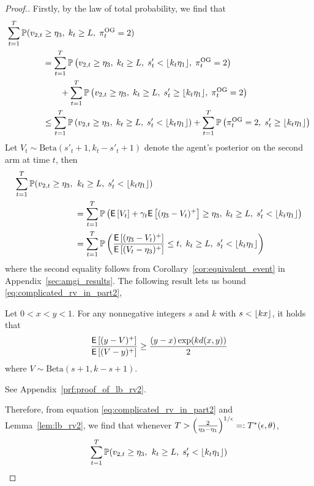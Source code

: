 \begin{proof}[Proof.]
	Firstly, by the law of total probability, we find that
	\begin{align} 
	\sum_{t=1}^T \mathbb{P}(v_{2,t} & \ge \eta_3 ,\; k_t \ge L,\; \pi^{\rm OG}_t = 2) \nonumber \\
	& = \sum_{t=1}^T \mathbb{P} \left( v_{2,t} \ge \eta_3 ,\; k_t \ge L, \; s'_t < \lfloor k_t \eta_1\rfloor, \; \pi^{\rm OG}_t = 2 \right) \nonumber \\
	& \qquad + \sum_{t=1}^T \mathbb{P} \left( v_{2,t} \ge \eta_3 ,\; k_t \ge L, \; s'_t \ge \lfloor k_t \eta_1\rfloor,\; \pi^{\rm OG}_t = 2 \right) \nonumber \\
	& \le \sum_{t=1}^T \mathbb{P} \left( v_{2,t} \ge \eta_3 ,\; k_t \ge L, \; s'_t < \lfloor k_t \eta_1\rfloor \right) + \sum_{t=1}^T \mathbb{P} \left( \pi^{\rm OG}_t = 2,\; s'_t \ge \lfloor k_t \eta_1\rfloor \right) \label{eqn:splitting_not_underestimate}
	\end{align}
	Let $V_t \sim \text{Beta}(s'_t + 1, k_t- s'_t + 1)$ denote the agent's posterior on the second arm at time $t$, then
	\begin{align}
	\sum_{t=1}^T \mathbb{P}(v_{2,t} \ge \eta_3 ,\; & \; k_t \ge L,\; s'_t < \lfloor k_t \eta_1\rfloor)  \nonumber\\
	& = \sum_{t=1}^T \mathbb{P} \left( \mathsf{E} \left[ V_t \right] + \gamma_t \mathsf{E} \left[ (\eta_3 - V_t)^+ \right] \ge \eta_3, \; k_t \ge L,\; s'_t < \lfloor k_t \eta_1\rfloor \right) \nonumber \\
	& = \sum_{t=1}^T \mathbb{P} \left( \frac{\mathsf{E} \left[ (\eta_3-V_t)^+  \right]}{  \mathsf{E} \left[ (V_t - \eta_3)^+  \right]} \le t , \; k_t \ge L,\; s'_t < \lfloor k_t \eta_1\rfloor \right) \label{eq:complicated_rv_in_part2}
	\end{align}
	where the second equality follows from Corollary~\ref{cor:equivalent_event} in Appendix~\ref{sec:amgi_results}. The following result lets us bound \eqref{eq:complicated_rv_in_part2},
	\begin{lemma} \label{lem:lb_rv2}
		Let $0 < x < y < 1$. For any nonnegative integers $s$ and $k$ with $s < \lfloor kx\rfloor$, it holds that
		\begin{equation*}
		\frac{\mathsf{E} \left[ (y-V)^+  \right]}{  \mathsf{E} \left[ (V - y)^+  \right] } \ge \frac{(y-x) \exp(k d(x,y))}{2}
		\end{equation*}
		where $V \sim \text{Beta}(s+1,k-s+1)$.
	\end{lemma}
	\begin{myproof}[Proof.]
		See Appendix~\ref{prf:proof_of_lb_rv2}.
	\end{myproof}
	Therefore, from equation \eqref{eq:complicated_rv_in_part2} and Lemma~\ref{lem:lb_rv2}, we find that whenever $T > \left(\frac{2}{\eta_3-\eta_1}\right)^{1/\epsilon} =: T^*(\epsilon, \theta)$,
	\begin{align}
	\sum_{t=1}^T \mathbb{P}(v_{2,t} \ge \eta_3 ,\; & \; k_t \ge L,\; s'_t < \floor{k_t \eta_1}) \nonumber \\

\end{align}
\end{proof}
